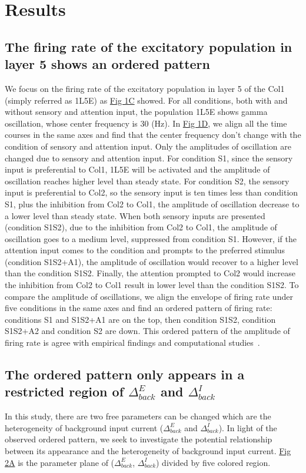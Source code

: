 \documentclass[10pt,letterpaper]{article}
\begin{document}
\section*{Results}
\subsection*{The firing rate of the excitatory population in layer 5 shows an ordered pattern}
We focus on the firing rate of the excitatory population in layer 5 of the Col1 (simply referred as 1L5E) as \hyperlink{fig:fig1}{Fig 1C} showed. For all conditions, both with and without sensory and attention input, the population 1L5E shows gamma oscillation, whose center frequency is 30 (Hz). In \hyperlink{fig:fig1}{Fig 1D}, we align all the time courses in the same axes and find that the center frequency don't change with the condition of sensory and attention input. Only the amplitudes of oscillation are changed due to sensory and attention input. For condition S1, since the sensory input is preferential to Col1, 1L5E will be activated and the amplitude of oscillation reaches higher level than steady state. For condition S2, the sensory input is preferential to Col2, so the sensory input is ten times less than condition S1, plus the inhibition from Col2 to Col1, the amplitude of oscillation decrease to a lower level than steady state. When both sensory inputs are presented (condition S1S2), due to the inhibition from Col2 to Col1, the amplitude of oscillation goes to a medium level, suppressed from condition S1. However, if the attention input comes to the condition and prompts to the preferred stimulus (condition S1S2+A1), the amplitude of oscillation would recover to a higher level than the condition S1S2. Finally, the attention prompted to Col2 would increase the inhibition from Col2 to Col1 result in lower level than the condition S1S2. To compare the amplitude of oscillations, we align the envelope of firing rate under five conditions in the same axes and find an ordered pattern of firing rate: conditions S1 and S1S2+A1 are on the top, then condition S1S2, condition S1S2+A2 and condition S2 are down. This ordered pattern of the amplitude of firing rate is agree with empirical findings and computational studies~\cite{wagatsuma2011}.

\subsection*{The ordered pattern only appears in a restricted region of $\Delta_{back}^{E}$ and $\Delta_{back}^{I}$}
In this study, there are two free parameters can be changed which are the heterogeneity of background input current ($\Delta_{back}^{E}$ and $\Delta_{back}^{I}$). In light of the observed ordered pattern, we seek to investigate the potential relationship between its appearance and the heterogeneity of background input current. \hyperlink{fig:fig2}{Fig 2A} is the parameter plane of ($\Delta_{back}^{E}$, $\Delta_{back}^{I}$) divided by five colored region. 
\end{document}
